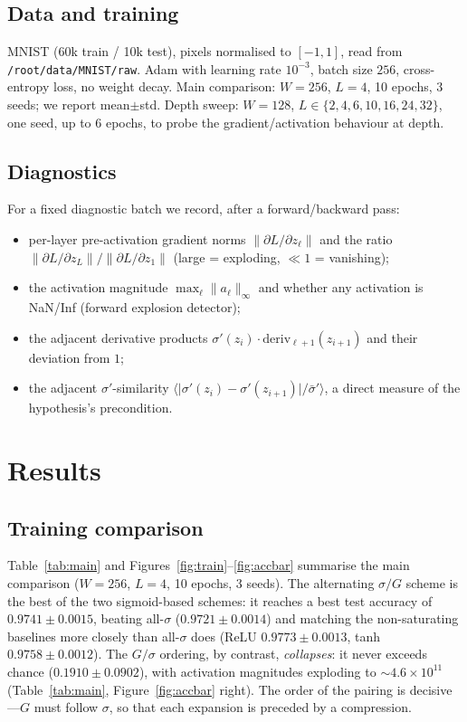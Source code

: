 \documentclass[11pt]{article}
\begin{document}
\subsection{Data and training}
MNIST (60k train / 10k test), pixels normalised to $[-1,1]$, read from
\texttt{/root/data/MNIST/raw}.  Adam with learning rate $10^{-3}$, batch size $256$,
cross-entropy loss, no weight decay.  Main comparison: $W=256$, $L=4$, 10
epochs, 3 seeds; we report mean$\pm$std.  Depth sweep: $W=128$, $L\in\{2,4,6,10,16,24,32\}$,
one seed, up to 6 epochs, to probe the gradient/activation behaviour at depth.

\subsection{Diagnostics}
For a fixed diagnostic batch we record, after a forward/backward pass:
\begin{itemize}
  \item per-layer pre-activation gradient norms $\|\partial L/\partial z_\ell\|$
        and the ratio $\|\partial L/\partial z_L\|/\|\partial L/\partial z_1\|$
        (large = exploding, $\ll1$ = vanishing);
  \item the activation magnitude $\max_\ell \|a_\ell\|_\infty$ and whether any
        activation is NaN/Inf (forward explosion detector);
  \item the adjacent derivative products
        $\sigma'(z_i)\cdot\text{deriv}_{\ell+1}(z_{i+1})$ and their deviation
        from $1$;
  \item the adjacent $\sigma'$-similarity
        $\bigl\langle\bigl|\sigma'(z_i)-\sigma'(z_{i+1})\bigr|/\bar\sigma'\bigr\rangle$,
        a direct measure of the hypothesis's precondition.
\end{itemize}

\section{Results}
\label{sec:results}

\subsection{Training comparison}
\label{sec:results-training}
Table~\ref{tab:main} and Figures~\ref{fig:train}--\ref{fig:accbar} summarise the
main comparison ($W=256$, $L=4$, 10 epochs, 3 seeds).  The alternating
$\sigma/G$ scheme is the best of the two sigmoid-based schemes: it reaches a best
test accuracy of $0.9741\pm0.0015$, beating all-$\sigma$
($0.9721\pm0.0014$) and matching the non-saturating baselines more closely than
all-$\sigma$ does (ReLU $0.9773\pm0.0013$, tanh $0.9758\pm0.0012$).  The
$G/\sigma$ ordering, by contrast, \emph{collapses}: it never exceeds chance
($0.1910\pm0.0902$), with activation magnitudes exploding to $\sim4.6\times10^{11}$
(Table~\ref{tab:main}, Figure~\ref{fig:accbar} right).  The order of the pairing
is decisive---$G$ must follow $\sigma$, so that each expansion is preceded by a
compression.
\end{document}
